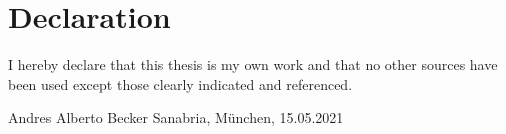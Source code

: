 \chapter*{Declaration}

\vfill

I hereby declare that this thesis is my own work and that no other sources have been used except those clearly indicated and referenced.

\vspace{3em}

\noindent Andres Alberto Becker Sanabria, München, 15.05.2021
